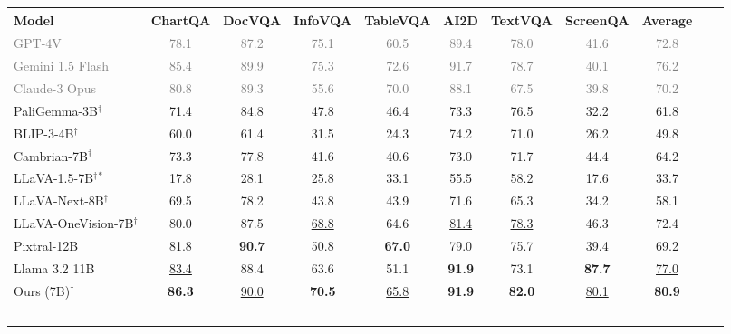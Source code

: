\begin{table*}[!ht]
    \small
    \centering
    \setlength{\tabcolsep}{4.5pt}
    \begin{tabular}{lcccccccccc}
        \toprule
        \textbf{Model} & \textbf{ChartQA} & \textbf{DocVQA} & \textbf{InfoVQA} & \textbf{TableVQA} & \textbf{AI2D} & \textbf{TextVQA} & \textbf{ScreenQA} & \textbf{Average} \\
        \midrule
        \textcolor{gray}{GPT-4V} & \textcolor{gray}{78.1} & \textcolor{gray}{87.2} & \textcolor{gray}{75.1} & \textcolor{gray}{60.5} & \textcolor{gray}{89.4} & \textcolor{gray}{78.0} & \textcolor{gray}{41.6} & \textcolor{gray}{72.8} \\
        \textcolor{gray}{Gemini 1.5 Flash} & \textcolor{gray}{85.4} & \textcolor{gray}{89.9} & \textcolor{gray}{75.3} & \textcolor{gray}{72.6} & \textcolor{gray}{91.7} & \textcolor{gray}{78.7} & \textcolor{gray}{40.1} & \textcolor{gray}{76.2} \\
        \textcolor{gray}{Claude-3 Opus} & \textcolor{gray}{80.8} & \textcolor{gray}{89.3} & \textcolor{gray}{55.6} & \textcolor{gray}{70.0} & \textcolor{gray}{88.1} & \textcolor{gray}{67.5} & \textcolor{gray}{39.8} & \textcolor{gray}{70.2} \\ \midrule
        PaliGemma-3B$^\dagger$ & 71.4 & 84.8 & 47.8 & 46.4 & 73.3 & 76.5 & 32.2 & 61.8  \\
        BLIP-3-4B$^\dagger$ & 60.0 & 61.4 & 31.5 & 24.3 & 74.2 & 71.0 & 26.2 & 49.8 \\ 
        Cambrian-7B$^\dagger$ & 73.3 & 77.8 & 41.6 & 40.6 & 73.0 & 71.7 & 44.4 & 64.2 \\
        LLaVA-1.5-7B$^\dagger$$^*$ & 17.8 & 28.1 & 25.8 & 33.1 & 55.5 & 58.2 & 17.6 & 33.7 \\
        LLaVA-Next-8B$^\dagger$ & 69.5 & 78.2 & 43.8 & 43.9 & 71.6 & 65.3 & 34.2 &  58.1 \\ 
        LLaVA-OneVision-7B$^\dagger$ & 80.0 & 87.5 & \underline{68.8} & 64.6 & \underline{81.4} & \underline{78.3} & 46.3 & 72.4 \\
        Pixtral-12B & 81.8 & \textbf{90.7} & 50.8 & \textbf{67.0} & 79.0 & 75.7 & 39.4 & 69.2 \\ 
        Llama 3.2 11B & \underline{83.4} & 88.4 & 63.6 & 51.1 & \textbf{91.9} & 73.1 & \textbf{87.7} & \underline{77.0} \\ \midrule
        \cellcolor{gray!10}Ours (7B)$^\dagger$ & \cellcolor{gray!10}\textbf{86.3} & \cellcolor{gray!10}\underline{90.0} & \cellcolor{gray!10}\textbf{70.5} & \cellcolor{gray!10}\underline{65.8} & \cellcolor{gray!10}\textbf{91.9} &  \cellcolor{gray!10}\textbf{82.0} & \cellcolor{gray!10}\underline{80.1} & \cellcolor{gray!10}\textbf{80.9} \\ 
$$
\end{tabular}
\end{table*}
